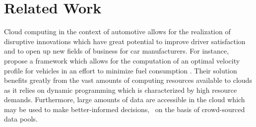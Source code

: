 \chapter{Related Work}\label{chapter:related-work}
Cloud computing in the context of automotive allows for the realization of disruptive innovations which have great potential to improve driver satisfaction and to open up new fields of business for car manufacturers. For instance, \citeauthor*{wollaeger2012cloud} propose a framework which allows for the computation of an optimal velocity profile for vehicles in an effort to minimize fuel consumption \cite{wollaeger2012cloud}. Their solution benefits greatly from the vast amounts of computing resources available to clouds as it relies on dynamic programming which is characterized by high resource demands. Furthermore, large amounts of data are accessible in the cloud which may be used to make better-informed decisions, \eg\ on the basis of crowd-sourced data pools.

